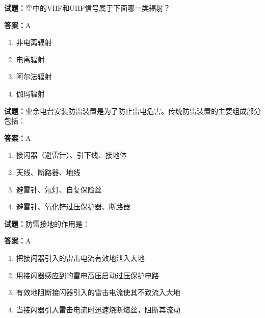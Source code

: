 \documentclass{ctexbook}
\begin{document}
\textbf{试题：}空中的VHF和UHF信号属于下面哪一类辐射？ 

\textbf{答案：}A 

\begin{enumerate}[leftmargin=3em]
  \item 非电离辐射 

  \item 电离辐射 

  \item 阿尔法辐射 

  \item 伽玛辐射 

\end{enumerate}





\vspace{1em}

\textbf{试题：}业余电台安装防雷装置是为了防止雷电危害。传统防雷装置的主要组成部分包括： 

\textbf{答案：}A 

\begin{enumerate}[leftmargin=3em]
  \item 接闪器（避雷针）、引下线、接地体 

  \item 天线、断路器、地线 

  \item 避雷针、氖灯、自复保险丝 


  \item 避雷针、氧化锌过压保护器、断路器 

\end{enumerate}





\vspace{1em}

\textbf{试题：}防雷接地的作用是： 

\textbf{答案：}A 

\begin{enumerate}[leftmargin=3em]
  \item 把接闪器引入的雷击电流有效地泄入大地 

  \item 用接闪器感应到的雷电高压启动过压保护电路 

  \item 有效地阻断接闪器引入的雷击电流使其不致流入大地 

  \item 当接闪器引入雷击电流时迅速烧断熔丝，阻断其流动 

\end{enumerate}
\end{document}
